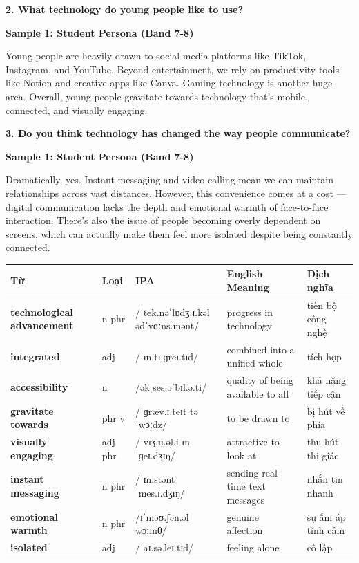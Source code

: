 \separator

\begin{ieltsquestion}
\textbf{2. What technology do young people like to use?}
\end{ieltsquestion}
\textbf{Sample 1: Student Persona (Band 7-8)}

Young people are heavily drawn to social media platforms like TikTok, Instagram, and YouTube. Beyond entertainment, we rely on productivity tools like Notion and creative apps like Canva. Gaming technology is another huge area. Overall, young people gravitate towards technology that's mobile, connected, and visually engaging.

\separator

\begin{ieltsquestion}
\textbf{3. Do you think technology has changed the way people communicate?}
\end{ieltsquestion}
\textbf{Sample 1: Student Persona (Band 7-8)}

Dramatically, yes. Instant messaging and video calling mean we can maintain relationships across vast distances. However, this convenience comes at a cost — digital communication lacks the depth and emotional warmth of face-to-face interaction. There's also the issue of people becoming overly dependent on screens, which can actually make them feel more isolated despite being constantly connected.

\separator


\vspace{0.8em}
\begin{center}
\renewcommand{\arraystretch}{1.65}
\begin{tabularx}{\textwidth}{|V{0.22\textwidth}|C{0.07\textwidth}|I{0.20\textwidth}|Y|V{0.18\textwidth}|}
\hline
{}
\textbf{Từ} & \textbf{Loại} & \textbf{IPA} & \textbf{English Meaning} & \textbf{Dịch nghĩa} \\
\hline
\textbf{technological advancement} & n phr & /ˌtek.nəˈlɒdʒ.ɪ.kəl ədˈvɑːns.mənt/ & progress in technology & tiến bộ công nghệ \\ \hline
\textbf{integrated} & adj & /ˈɪn.tɪ.ɡreɪ.tɪd/ & combined into a unified whole & tích hợp \\ \hline
\textbf{accessibility} & n & /əkˌses.əˈbɪl.ə.ti/ & quality of being available to all & khả năng tiếp cận \\ \hline
\textbf{gravitate towards} & phr v & /ˈɡræv.ɪ.teɪt təˈwɔːdz/ & to be drawn to & bị hút về phía \\ \hline
\textbf{visually engaging} & adj phr & /ˈvɪʒ.u.əl.i ɪnˈɡeɪ.dʒɪŋ/ & attractive to look at & thu hút thị giác \\ \hline
\textbf{instant messaging} & n phr & /ˈɪn.stənt ˈmes.ɪ.dʒɪŋ/ & sending real-time text messages & nhắn tin nhanh \\ \hline
\textbf{emotional warmth} & n phr & /ɪˈməʊ.ʃən.əl wɔːmθ/ & genuine affection & sự ấm áp tình cảm \\ \hline
\textbf{isolated} & adj & /ˈaɪ.sə.leɪ.tɪd/ & feeling alone & cô lập \\ \hline
\end{tabularx}
\end{center}

